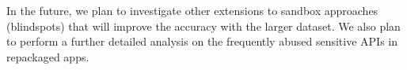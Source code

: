 In the future, we plan to investigate other extensions to sandbox approaches (blindspots) that will improve the accuracy with the larger dataset. We also plan to perform a further detailed analysis on the frequently abused sensitive APIs in repackaged apps. 

\begin{comment}
In this paper, we conducted a study in which we observed the accuracy result, in terms of malware detection, of the state of the art mining sandbox approach. In our experiment, we used the test generator tool Droidbot to explore sensitive APIs called by malware at a real-word dataset of $800$, containing more representative samples than previous works. Our results demonstrated that the accuracy of Droidbot for malware detection drops to $24.12\%$ when we compare it with previous works, which explored a smaller sample. This first experiment also helps us to conclude that only a few sensitive APIs are responsible for most injected malware code at our repackaged sample.

These results encourage us to investigate how we could improve the mine sandbox approach. Hence, we investigated how relevant a dynamic call graph analysis and a simple manifest files analysis are to improving malware detection in the mine sandbox approach. Our investigation present relevant findings. First, with dynamic call graph analysis, we find that its possible to improve malware detection, if we consider trace analysis as a factor. Moreover, we present that a simple static analysis of manifest files also improves malware detection, complementing even the dynamic call graph analysis in terms of malware detection.

Our finds provide possible future research directions to further improve the mine sandbox approach. As future work, we plan to investigate if the distance at a dynamic call graph, between the Android app entry point and a call for a sensitive API has influence on the accuracy rate of malware detection at mine Android sandbox. We also plan to investigate the hypothesis that the test tool coverage used at mine Android Sandbox, can further benefit the approach since it provide more traces at dynamic call graph to inspect. Finally, we plan understand which are the malware features present at our dataset, that led accuracy of sandboxes approach drop significantly, when compared with previous work.
\end{comment}